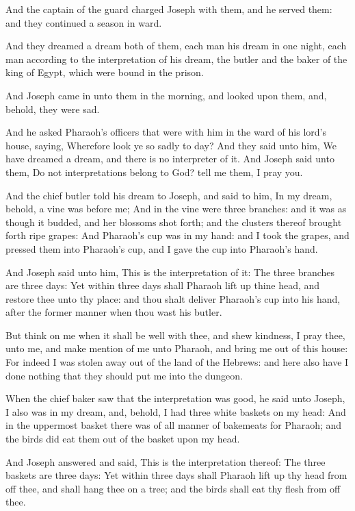 \Verse And the captain of the guard charged Joseph with them, and he served them: and they continued a season in ward.

\Verse And they dreamed a dream both of them, each man his dream in one night, each man according to the interpretation of his dream, the butler and the baker of the king of Egypt, which were bound in the prison.

\Verse And Joseph came in unto them in the morning, and looked upon them, and, behold, they were sad.

\Verse And he asked Pharaoh's officers that were with him in the ward of his lord's house, saying, Wherefore look ye so sadly to day?  \Verse And they said unto him, We have dreamed a dream, and there is no interpreter of it. And Joseph said unto them, Do not interpretations belong to God? tell me them, I pray you.

\Verse And the chief butler told his dream to Joseph, and said to him, In my dream, behold, a vine was before me; \Verse And in the vine were three branches: and it was as though it budded, and her blossoms shot forth; and the clusters thereof brought forth ripe grapes: \Verse And Pharaoh's cup was in my hand: and I took the grapes, and pressed them into Pharaoh's cup, and I gave the cup into Pharaoh's hand.

\Verse And Joseph said unto him, This is the interpretation of it: The three branches are three days: \Verse Yet within three days shall Pharaoh lift up thine head, and restore thee unto thy place: and thou shalt deliver Pharaoh's cup into his hand, after the former manner when thou wast his butler.

\Verse But think on me when it shall be well with thee, and shew kindness, I pray thee, unto me, and make mention of me unto Pharaoh, and bring me out of this house: \Verse For indeed I was stolen away out of the land of the Hebrews: and here also have I done nothing that they should put me into the dungeon.

\Verse When the chief baker saw that the interpretation was good, he said unto Joseph, I also was in my dream, and, behold, I had three white baskets on my head: \Verse And in the uppermost basket there was of all manner of bakemeats for Pharaoh; and the birds did eat them out of the basket upon my head.

\Verse And Joseph answered and said, This is the interpretation thereof: The three baskets are three days: \Verse Yet within three days shall Pharaoh lift up thy head from off thee, and shall hang thee on a tree; and the birds shall eat thy flesh from off thee.

